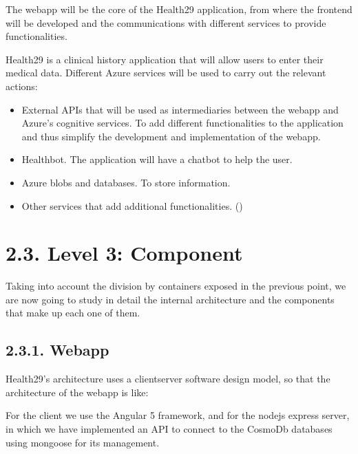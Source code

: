 \documentclass[letterpaper,10pt,english]{sphinxmanual}
\begin{document}
The webapp will be the core of the Health29 application, from where the frontend will be developed and the communications with different services to provide functionalities.

Health29 is a clinical history application that will allow users to enter their medical data. Different Azure services will be used to carry out the relevant actions:
\begin{itemize}
\item {} 
External APIs that will be used as intermediaries between the webapp and Azure’s cognitive services. To add different functionalities to the application and thus simplify the development and implementation of the webapp.

\item {} 
Healthbot. The application will have a chatbot to help the user.

\item {} 
Azure blobs and databases. To store information.

\item {} 
Other services that add additional functionalities. ()

\end{itemize}




\chapter{2.3. Level 3: Component}
\label{\detokenize{pages/SW/Components:level-3-component}}\label{\detokenize{pages/SW/Components::doc}}
Taking into account the division by containers exposed in the previous point, we are now going to study in detail the internal architecture and the components that make up each one of them.


\section{2.3.1. Webapp}
\label{\detokenize{pages/SW/Components:webapp}}
Health29’s architecture uses a client\sphinxhyphen{}server software design model, so that the architecture of the webapp is like:



For the client we use the Angular 5 framework, and for the nodejs \sphinxhyphen{} express server, in which we have implemented an API to connect to the CosmoDb databases using mongoose for its management.
\end{document}

